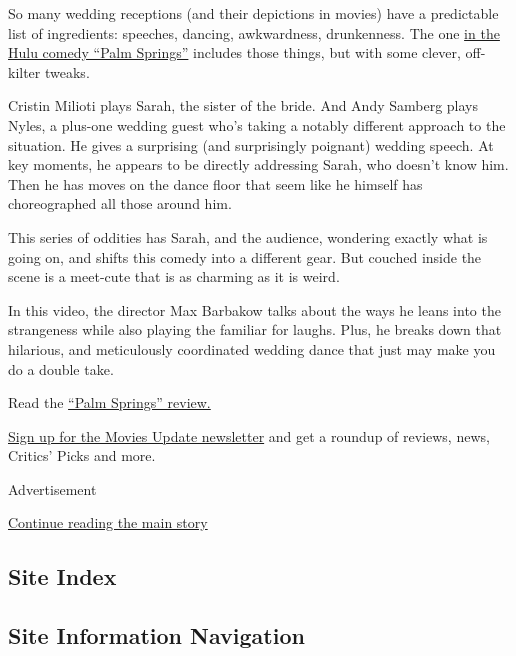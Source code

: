 So many wedding receptions (and their depictions in movies) have a
predictable list of ingredients: speeches, dancing, awkwardness,
drunkenness. The one
\href{https://www.hulu.com/movie/palm-springs-f70dfd4d-dbfb-46b8-abb3-136c841bba11?\&cmp=13289\&utm_source=google\&utm_medium=SEM\&utm_campaign=CM_SEM_PalmSprings\&utm_term=palm\%20springs\%20hulu\&gclsrc=aw.ds\&ds_rl=1251123\&gclid=Cj0KCQjwoub3BRC6ARIsABGhnybUMcE3YTcib1lAhH7G55y9vQXLZS-uwYcHjUIxOKwWbiAJGnAxRboaAtwlEALw_wcB}{in
the Hulu comedy ``Palm Springs''} includes those things, but with some
clever, off-kilter tweaks.

Cristin Milioti plays Sarah, the sister of the bride. And Andy Samberg
plays Nyles, a plus-one wedding guest who's taking a notably different
approach to the situation. He gives a surprising (and surprisingly
poignant) wedding speech. At key moments, he appears to be directly
addressing Sarah, who doesn't know him. Then he has moves on the dance
floor that seem like he himself has choreographed all those around him.

This series of oddities has Sarah, and the audience, wondering exactly
what is going on, and shifts this comedy into a different gear. But
couched inside the scene is a meet-cute that is as charming as it is
weird.

In this video, the director Max Barbakow talks about the ways he leans
into the strangeness while also playing the familiar for laughs. Plus,
he breaks down that hilarious, and meticulously coordinated wedding
dance that just may make you do a double take.

Read the
\href{https://www.nytimes.com/2020/07/09/movies/palm-springs-review.html}{``Palm
Springs'' review.}

\href{https://www.nytimes.com/newsletters/moviesupdate?module=inline}{Sign
up for the Movies Update newsletter} and get a roundup of reviews, news,
Critics' Picks and more.

Advertisement

\protect\hyperlink{after-bottom}{Continue reading the main story}

\hypertarget{site-index}{%
\subsection{Site Index}\label{site-index}}

\hypertarget{site-information-navigation}{%
\subsection{Site Information
Navigation}\label{site-information-navigation}}

